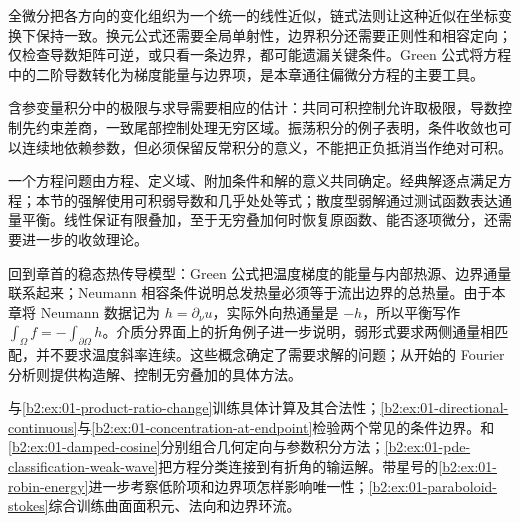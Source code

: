 



\begin{chaptersummary}
全微分把各方向的变化组织为一个统一的线性近似，链式法则让这种近似在坐标变换下保持一致。换元公式还需要全局单射性，边界积分还需要正则性和相容定向；仅检查导数矩阵可逆，或只看一条边界，都可能遗漏关键条件。Green 公式将方程中的二阶导数转化为梯度能量与边界项，是本章通往偏微分方程的主要工具。

\ProseParagraphBreak

含参变量积分中的极限与求导需要相应的估计：共同可积控制允许取极限，导数控制先约束差商，一致尾部控制处理无穷区域。振荡积分的例子表明，条件收敛也可以连续地依赖参数，但必须保留反常积分的意义，不能把正负抵消当作绝对可积。

\ProseParagraphBreak

一个方程问题由方程、定义域、附加条件和解的意义共同确定。经典解逐点满足方程；本节的强解使用可积弱导数和几乎处处等式；散度型弱解通过测试函数表达通量平衡。线性保证有限叠加，至于无穷叠加何时恢复原函数、能否逐项微分，还需要进一步的收敛理论。

\ProseParagraphBreak

回到章首的稳态热传导模型：Green 公式把温度梯度的能量与内部热源、边界通量联系起来；Neumann 相容条件说明总发热量必须等于流出边界的总热量。由于本章将 Neumann 数据记为 \(h=\partial_\nu u\)，实际外向热通量是 \(-h\)，所以平衡写作 \(\int_\Omega f=-\int_{\partial\Omega}h\)。介质分界面上的折角例子进一步说明，弱形式要求两侧通量相匹配，并不要求温度斜率连续。这些概念确定了需要求解的问题；从开始的 Fourier 分析则提供构造解、控制无穷叠加的具体方法。
\end{chaptersummary}


\BookExercises

与\cref{b2:ex:01-product-ratio-change}训练具体计算及其合法性；\cref{b2:ex:01-directional-continuous}与\cref{b2:ex:01-concentration-at-endpoint}检验两个常见的条件边界。和\cref{b2:ex:01-damped-cosine}分别组合几何定向与参数积分方法；\cref{b2:ex:01-pde-classification-weak-wave}把方程分类连接到有折角的输运解。带星号的\cref{b2:ex:01-robin-energy}进一步考察低阶项和边界项怎样影响唯一性；\cref{b2:ex:01-paraboloid-stokes}综合训练曲面面积元、法向和边界环流。


